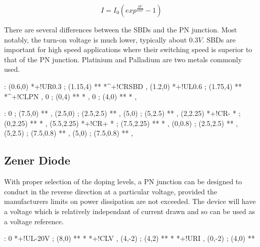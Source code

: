 \documentclass[a4paper,12pt]{article}
\begin{document}
\[ I = I_{0} \left( exp^{\frac{q V}{nkT}} -1 \right) \]

There are several differences between the SBDs and the PN
junction. Most notably, the turn-on voltage is much lower, typically
about $0.3V$. SBDs are important for high speed applications where their
switching speed is superior to that of the PN junction. Platinium and
Palladium are two metals commonly used.

\begin{table}[hbtp]

\xy <1cm,0cm>:
(0.6,0) *+!UR{0.3} ; (1.15,4) ** *^+!CR{SBD} ,
(1.2,0) *+!UL{0.6} ; (1.75,4) ** *^+!CL{PN} ,
0 ; (0,4) **\dir{-} *\dir{>} ,
0 ; (4,0) **\dir{-} *\dir{>} ,
\endxy

\end{table}

\vspace{10mm}

\begin{table}[hbtp]

\xy <1cm,0cm>:
0 ; (7.5,0) **\dir{-} ,
(2.5,0) ; (2.5,2.5) **\dir{-} ,
(5,0) ; (5,2.5) **\dir{-} ,
(2,2.25) *+!CR{-} * ; (0,2.25) **\dir{-} *\dir{>} ,
(5.5,2.25) *+!CR{+} * ; (7.5,2.25) **\dir{-} *\dir{>} ,
(0,0.8) ; (2.5,2.5) ** ,
(5,2.5) ; (7.5,0.8) ** ,
(5,0) ; (7.5,0.8) ** ,
\endxy

\end{table}

\subsection{Zener Diode}

With proper selection of the doping levels, a PN junction can be
designed to conduct in the reverse direction at a particular voltage,
provided the manufacturers limits on power dissipation are not exceeded.
The device will have a voltage which is relatively independant of
current drawn and so can be used as a voltage reference.

\begin{table}[hbtp]

\xy <1cm,0cm>:
0 *+!UL{-20V} ; (8,0) **\dir{-} *\dir{>} *+!CL{V} ,
(4,-2) ; (4,2) **\dir{-} *\dir{>} *+!UR{I} ,
(0,-2) ; (4,0) **
\endxy

\end{table}
\end{document}
